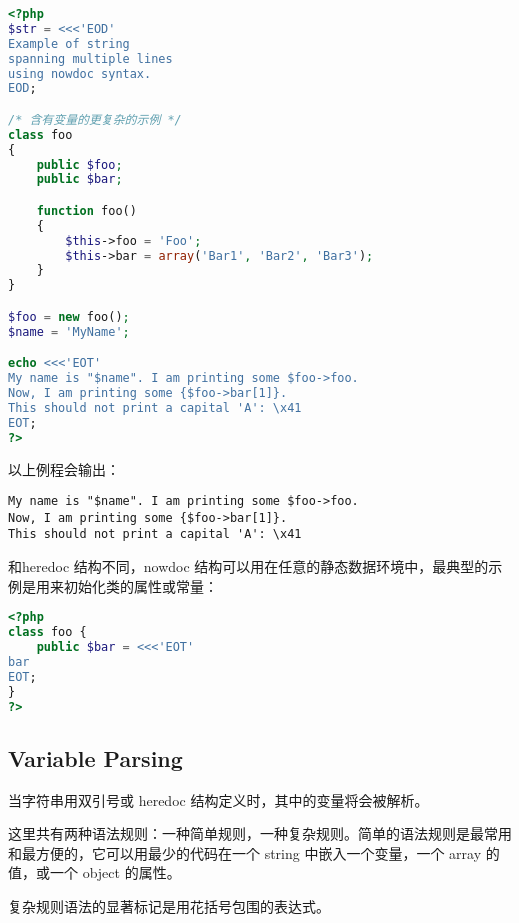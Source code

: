 \begin{lstlisting}[language=PHP]
<?php
$str = <<<'EOD'
Example of string
spanning multiple lines
using nowdoc syntax.
EOD;

/* 含有变量的更复杂的示例 */
class foo
{
    public $foo;
    public $bar;

    function foo()
    {
        $this->foo = 'Foo';
        $this->bar = array('Bar1', 'Bar2', 'Bar3');
    }
}

$foo = new foo();
$name = 'MyName';

echo <<<'EOT'
My name is "$name". I am printing some $foo->foo.
Now, I am printing some {$foo->bar[1]}.
This should not print a capital 'A': \x41
EOT;
?>
\end{lstlisting}

以上例程会输出：

\begin{verbatim}
My name is "$name". I am printing some $foo->foo.
Now, I am printing some {$foo->bar[1]}.
This should not print a capital 'A': \x41
\end{verbatim}

和heredoc 结构不同，nowdoc 结构可以用在任意的静态数据环境中，最典型的示例是用来初始化类的属性或常量：

\begin{lstlisting}[language=PHP]
<?php
class foo {
    public $bar = <<<'EOT'
bar
EOT;
}
?>
\end{lstlisting}






\subsection{Variable Parsing}

当字符串用双引号或 heredoc 结构定义时，其中的变量将会被解析。

这里共有两种语法规则：一种简单规则，一种复杂规则。简单的语法规则是最常用和最方便的，它可以用最少的代码在一个 string 中嵌入一个变量，一个 array 的值，或一个 object 的属性。

复杂规则语法的显著标记是用花括号包围的表达式。

